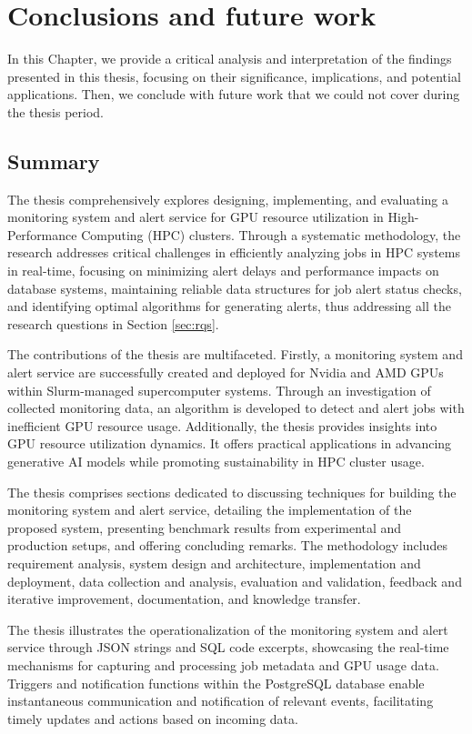 \chapter{Conclusions and future work}
\label{chap:conclusions}
In this Chapter, we provide a critical analysis and interpretation of the findings presented in this thesis, focusing on their significance, implications, and potential applications. Then, we conclude with future work that we could not cover during the thesis period.

\section{Summary}

The thesis comprehensively explores designing, implementing, and evaluating a monitoring system and alert service for GPU resource utilization in High-Performance Computing (HPC) clusters. Through a systematic methodology, the research addresses critical challenges in efficiently analyzing jobs in HPC systems in real-time, focusing on minimizing alert delays and performance impacts on database systems, maintaining reliable data structures for job alert status checks, and identifying optimal algorithms for generating alerts, thus addressing all the research questions in Section \ref{sec:rqs}.

The contributions of the thesis are multifaceted. Firstly, a monitoring system and alert service are successfully created and deployed for Nvidia and AMD GPUs within Slurm-managed supercomputer systems. Through an investigation of collected monitoring data, an algorithm is developed to detect and alert jobs with inefficient GPU resource usage. Additionally, the thesis provides insights into GPU resource utilization dynamics. It offers practical applications in advancing generative AI models while promoting sustainability in HPC cluster usage.

The thesis comprises sections dedicated to discussing techniques for building the monitoring system and alert service, detailing the implementation of the proposed system, presenting benchmark results from experimental and production setups, and offering concluding remarks. The methodology includes requirement analysis, system design and architecture, implementation and deployment, data collection and analysis, evaluation and validation, feedback and iterative improvement, documentation, and knowledge transfer.

The thesis illustrates the operationalization of the monitoring system and alert service through JSON strings and SQL code excerpts, showcasing the real-time mechanisms for capturing and processing job metadata and GPU usage data. Triggers and notification functions within the PostgreSQL database enable instantaneous communication and notification of relevant events, facilitating timely updates and actions based on incoming data.

